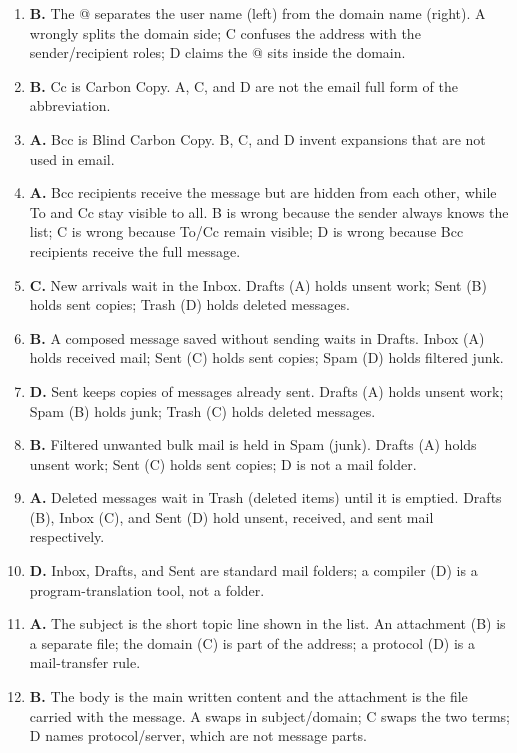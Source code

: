 \begin{enumerate}[label=\textbf{Q\arabic*.}, leftmargin=*]
\item \textbf{B.} The @ separates the user name (left) from the domain name
  (right). A wrongly splits the domain side; C confuses the address with the
  sender/recipient roles; D claims the @ sits inside the domain.
\item \textbf{B.} Cc is Carbon Copy. A, C, and D are not the email full form
  of the abbreviation.
\item \textbf{A.} Bcc is Blind Carbon Copy. B, C, and D invent expansions
  that are not used in email.
\item \textbf{A.} Bcc recipients receive the message but are hidden from each
  other, while To and Cc stay visible to all. B is wrong because the sender
  always knows the list; C is wrong because To/Cc remain visible; D is wrong
  because Bcc recipients receive the full message.
\item \textbf{C.} New arrivals wait in the Inbox. Drafts (A) holds unsent
  work; Sent (B) holds sent copies; Trash (D) holds deleted messages.
\item \textbf{B.} A composed message saved without sending waits in Drafts.
  Inbox (A) holds received mail; Sent (C) holds sent copies; Spam (D) holds
  filtered junk.
\item \textbf{D.} Sent keeps copies of messages already sent. Drafts (A)
  holds unsent work; Spam (B) holds junk; Trash (C) holds deleted messages.
\item \textbf{B.} Filtered unwanted bulk mail is held in Spam (junk). Drafts
  (A) holds unsent work; Sent (C) holds sent copies; D is not a mail folder.
\item \textbf{A.} Deleted messages wait in Trash (deleted items) until it is
  emptied. Drafts (B), Inbox (C), and Sent (D) hold unsent, received, and
  sent mail respectively.
\item \textbf{D.} Inbox, Drafts, and Sent are standard mail folders; a
  compiler (D) is a program-translation tool, not a folder.
\item \textbf{A.} The subject is the short topic line shown in the list. An
  attachment (B) is a separate file; the domain (C) is part of the address;
  a protocol (D) is a mail-transfer rule.
\item \textbf{B.} The body is the main written content and the attachment is
  the file carried with the message. A swaps in subject/domain; C swaps the
  two terms; D names protocol/server, which are not message parts.

\end{enumerate}
